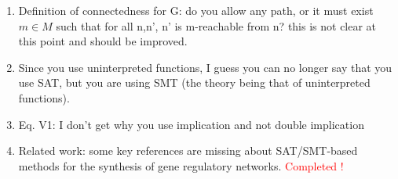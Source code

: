 \documentclass{llncs}
\begin{document}
\begin{enumerate}
\item Definition of connectedness for G: do you allow any path, or it must exist $m \in M$ such that for all n,n', n' is m-reachable from n? this is not clear at this point
and should be improved. \newline
{\color{red}{Ashutosh}}\\


\item Since you use uninterpreted functions, I guess you can no longer say that you use
SAT,  but you are using SMT (the theory being that of uninterpreted functions).\newline
{\color{red}{Srivas, Ankit, Ashutosh}}\\

\item Eq. V1: I don't get why you use implication and not double implication \newline
{\color{red}{Ashutosh}}\\

\item Related work: some key references are missing about SAT/SMT-based methods for the
synthesis of gene regulatory networks.\newline
\textcolor{red}{Completed !}
\end{enumerate}
\end{document}
